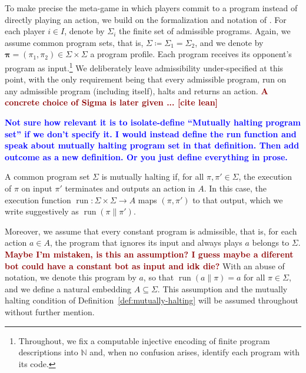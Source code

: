 \documentclass[twoside,11pt]{article}
\newcommand{\boldred}[1]{\textbf{\textcolor{darkred}{#1}}}
\newcommand{\boldblue}[1]{\textbf{\textcolor{blue}{#1}}}
\begin{document}
To make precise the meta-game in which players commit to a program instead of directly playing an action, we build on the formalization and notation of \cite{duclaux2026proving}. For each player $i \in I$, denote by $\Sigma_i$ the finite set of admissible programs. Again, we assume common program sets, that is, $\Sigma \coloneq \Sigma_1 = \Sigma_2$, and we denote by $\bm{\pi}= (\pi_1, \pi_2) \in \Sigma \times \Sigma$ a program profile. Each program receives its opponent's program as input.\footnote{Throughout, we fix a computable injective encoding of finite program descriptions into $\mathbb{N}$ and, when no confusion arises, identify each program with its code.} We deliberately leave admissibility under-specified at this point, with the only requirement being that every admissible program, run on any admissible program (including itself), halts and returns an action. \boldred{A concrete choice of Sigma is later given ... [cite lean]}

\boldblue{Not sure how relevant it is to isolate-define \enquote{Mutually halting program set} if we don't specify it. I would instead define the run function and speak about mutually halting program set in that definition. Then add outcome as a new definition. Or you just define everything in prose.} 
\begin{definition}\label{def:mutually-halting}
  A common program set $\Sigma$ is mutually halting if, for all $\pi, \pi' \in \Sigma$, the execution of $\pi$ on input $\pi'$ terminates and outputs an action in $A$. In this case, the execution function $\operatorname{run} \colon \Sigma \times \Sigma \to A$ maps $(\pi, \pi')$ to that output, which we write suggestively as
  $\operatorname{run}(\pi \mathrel{\|} \pi')$. 
\end{definition}

Moreover, we assume that every constant program is admissible, that is, for each action $a \in A$, the program that ignores its input and always plays $a$ belongs to $\Sigma$. \boldred{Maybe I'm mistaken, is this an assumption? I guess maybe a diferent bot could have a constant bot as input and idk die?} With an abuse of notation, we denote this program by $a$, so that $\operatorname{run}(a \|\pi) = a$ for all $\pi \in \Sigma$, and we define a natural embedding $A \subseteq\Sigma$. This assumption and the mutually halting condition of Definition~\ref{def:mutually-halting} will be assumed throughout without further mention. 
\end{document}
